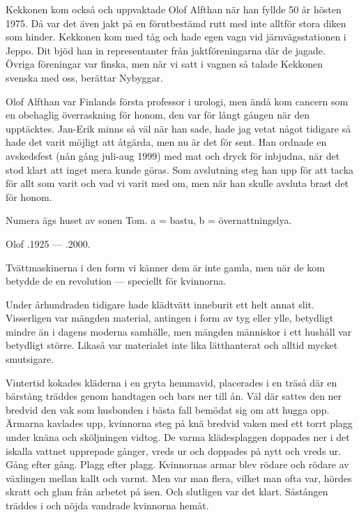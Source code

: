 Kekkonen kom också och uppvaktade Olof Alfthan när han fyllde 50 	år hösten 1975. Då var det även jakt på en förutbestämd rutt med inte alltför stora diken som hinder. Kekkonen kom med tåg och hade egen vagn vid järnvägsstationen i Jeppo. Dit bjöd han in representanter från jaktföreningarna där de jagade. Övriga föreningar var finska, men när vi satt i vagnen så talade Kekkonen svenska med oss, berättar Nybyggar.

Olof Alfthan var Finlands första professor i urologi, men ändå kom cancern som en obehaglig överraskning för honom, den var för långt gången när den upptäcktes. Jan-Erik minns så väl när han sade, hade jag vetat något tidigare så hade det varit möjligt att åtgärda, men nu är det för sent. Han ordnade en avskedsfest (nån gång juli-aug 1999) med mat och dryck för inbjudna, när det stod klart att inget mera kunde göras. Som avslutning steg han upp för att tacka för allt som 	varit och vad vi varit med om, men när han skulle avsluta brast det för honom.

Numera ägs huset av sonen Tom. a = bastu, b = övernattningslya.

Olof .1925 --- .2000.






\jhnooccupant{}

Tvättmaskinerna i den form vi känner dem är inte gamla, men när de kom betydde de en revolution --- speciellt för kvinnorna.

Under århundraden tidigare hade klädtvätt inneburit ett helt annat slit. Visserligen var mängden material, antingen i form av tyg eller ylle, betydligt mindre än i dagens moderna samhälle, men mängden människor i ett hushåll var betydligt större. Likaså var materialet inte lika lätthanterat och alltid mycket smutsigare.

Vintertid kokades kläderna  i en gryta hemmavid, placerades i en träså där en bärstång träddes genom handtagen och bars ner till ån. Väl där sattes den ner bredvid den vak som husbonden i bästa fall bemödat sig om att hugga opp. Ärmarna kavlades upp, kvinnorna steg på knä bredvid vaken med ett torrt plagg under knäna och sköljningen vidtog. De varma klädesplaggen doppades ner i det iskalla vattnet upprepade gånger, vreds ur och doppades på nytt och vreds ur. Gång efter gång. Plagg efter plagg. Kvinnornas armar blev rödare och rödare av växlingen mellan kallt och varmt. Men var man flera, vilket man ofta var, hördes skratt och glam från arbetet på isen. Och slutligen var det klart. Såstången träddes i och nöjda vandrade kvinnorna hemåt.

